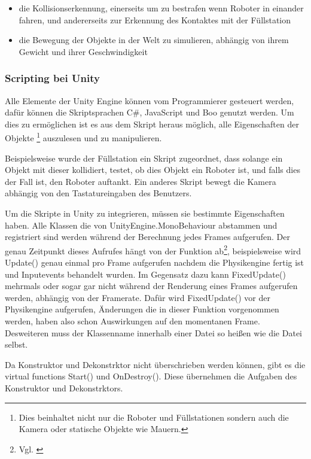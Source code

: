 \begin{itemize}
\item die Kollisionserkennung, einerseits um zu bestrafen wenn Roboter in einander fahren,
	und andererseits zur Erkennung des Kontaktes mit der F{\"{u}}llstation
\item die Bewegung der Objekte in der Welt zu simulieren, abh{\"{a}}ngig von ihrem Gewicht und ihrer Geschwindigkeit
\end{itemize}

\subsubsection{Scripting bei Unity}
Alle Elemente der Unity Engine k{\"{o}}nnen vom Programmierer gesteuert werden, daf{\"{u}}r k{\"{o}}nnen
die Skriptsprachen C\#, JavaScript und Boo genutzt werden.\cite{wiki:unity}
Um dies zu erm{\"{o}}glichen ist es aus dem Skript heraus m{\"{o}}glich, alle Eigenschaften
der Objekte \footnote{Dies beinhaltet nicht nur die Roboter und F{\"{u}}llstationen sondern auch die Kamera
oder statische Objekte wie Mauern.} auszulesen und zu manipulieren.

Beispielsweise wurde der F{\"{u}}llstation ein Skript zugeordnet, dass solange ein Objekt mit dieser kollidiert, testet, ob dies Objekt ein Roboter ist, und falls dies der Fall ist,
den Roboter auftankt. Ein anderes Skript bewegt die Kamera abh{\"{a}}ngig von den Tastatureingaben des Benutzers.

Um die Skripte in Unity zu integrieren, m{\"{u}}ssen sie bestimmte Eigenschaften haben. Alle Klassen die von UnityEngine.MonoBehaviour
abstammen und registriert sind werden w{\"{a}}hrend der Berechnung jedes Frames aufgerufen. Der genau Zeitpunkt dieses Aufrufes h{\"{a}}ngt von
der Funktion ab\footnote{Vgl. \cite{unity-exec-order}}, beispielsweise wird Update() genau einmal pro Frame aufgerufen nachdem die Physikengine fertig ist
und Inputevents behandelt wurden. Im Gegensatz dazu kann FixedUpdate() mehrmals oder sogar gar nicht w{\"{a}}hrend der Renderung eines Frames aufgerufen
werden, abh{\"{a}}ngig von der Framerate. Daf{\"{u}}r wird FixedUpdate() vor der Physikengine aufgerufen, {\"{A}}nderungen die in dieser
Funktion vorgenommen werden, haben also schon Auswirkungen auf den momentanen Frame. Desweiteren muss der Klassenname innerhalb einer Datei so
hei{\ss}en wie die Datei selbst.

Da Konstruktor und Dekonstrktor nicht {\"{u}}berschrieben werden k{\"{o}}nnen, gibt es die virtual functions Start() und OnDestroy(). Diese
{\"{u}}bernehmen die Aufgaben des Konstruktor und Dekonstrktors.

